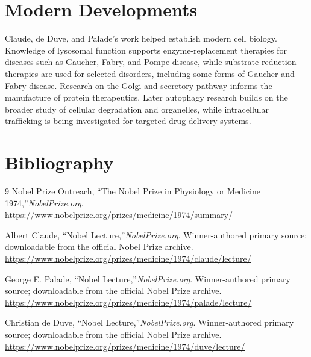 \section{Modern Developments}

Claude, de Duve, and Palade's work helped establish modern cell biology. Knowledge of lysosomal function supports enzyme-replacement therapies for diseases such as Gaucher, Fabry, and Pompe disease, while substrate-reduction therapies are used for selected disorders, including some forms of Gaucher and Fabry disease. Research on the Golgi and secretory pathway informs the manufacture of protein therapeutics. Later autophagy research builds on the broader study of cellular degradation and organelles, while intracellular trafficking is being investigated for targeted drug-delivery systems.


\section{Bibliography}

\begin{thebibliography}{9}
Nobel Prize Outreach, ``The Nobel Prize in Physiology or Medicine 1974,''\emph{NobelPrize.org}.\\
\url{https://www.nobelprize.org/prizes/medicine/1974/summary/}

Albert Claude, ``Nobel Lecture,''\emph{NobelPrize.org}. Winner-authored primary source; downloadable from the official Nobel Prize archive.\\
\url{https://www.nobelprize.org/prizes/medicine/1974/claude/lecture/}

George E. Palade, ``Nobel Lecture,''\emph{NobelPrize.org}. Winner-authored primary source; downloadable from the official Nobel Prize archive.\\
\url{https://www.nobelprize.org/prizes/medicine/1974/palade/lecture/}

Christian de Duve, ``Nobel Lecture,''\emph{NobelPrize.org}. Winner-authored primary source; downloadable from the official Nobel Prize archive.\\
\url{https://www.nobelprize.org/prizes/medicine/1974/duve/lecture/}
\end{thebibliography}
